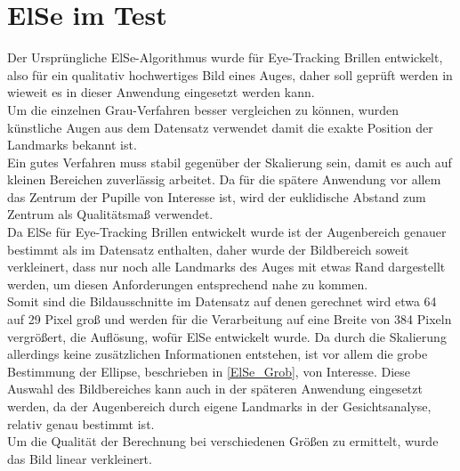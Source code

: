 \section{ElSe im Test}
Der Ursprüngliche ElSe-Algorithmus wurde für Eye-Tracking Brillen entwickelt, also für ein qualitativ hochwertiges Bild eines Auges, daher soll geprüft werden in wieweit es in dieser Anwendung eingesetzt werden kann.\\
Um die einzelnen Grau-Verfahren besser vergleichen zu können, wurden künstliche Augen aus dem Datensatz \cite{database_Eye} verwendet damit die exakte Position der Landmarks bekannt ist.\\
Ein gutes Verfahren muss stabil gegenüber der Skalierung sein, damit es auch auf kleinen Bereichen zuverlässig arbeitet. Da für die spätere Anwendung vor allem das Zentrum der Pupille von Interesse ist, wird der euklidische Abstand zum Zentrum als Qualitätsmaß verwendet.\\
Da ElSe für Eye-Tracking Brillen entwickelt wurde ist der Augenbereich genauer bestimmt als im Datensatz enthalten, daher wurde der Bildbereich soweit verkleinert, dass nur noch alle Landmarks des Auges mit etwas Rand dargestellt werden, um diesen Anforderungen entsprechend nahe zu kommen.\\
Somit sind die Bildausschnitte im Datensatz auf denen gerechnet wird etwa 64 auf 29 Pixel groß und werden für die Verarbeitung auf eine Breite von 384 Pixeln vergrößert, die Auflösung, wofür ElSe entwickelt wurde. Da durch die Skalierung allerdings keine zusätzlichen Informationen entstehen, ist vor allem die grobe Bestimmung der Ellipse, beschrieben in \autoref{ElSe_Grob}, von Interesse. Diese Auswahl des Bildbereiches kann auch in der späteren Anwendung eingesetzt werden, da der Augenbereich durch eigene Landmarks in der Gesichtsanalyse, relativ genau bestimmt ist.\\
Um die Qualität der Berechnung bei verschiedenen Größen zu ermittelt, wurde das Bild linear verkleinert.
